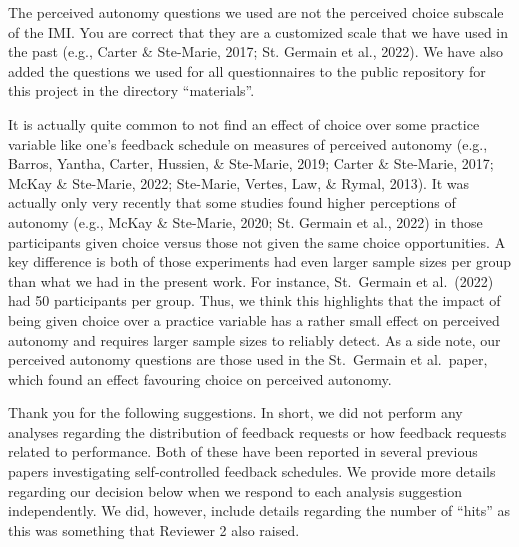 \documentclass[final]{article}
\newcommand{\TaskEstimationBox}[2]{%
\ifoptiondraft{\parbox{1.0\linewidth}{\hfill \hfill {\colorbox{#2}{\color{White} \textbf{#1}}}}}%
{}%
}
\def\Done {\TaskEstimationBox{Done}{Blue}}
\begin{document}
The perceived autonomy questions we used are not the perceived choice subscale of the IMI. You are correct that they are a customized scale that we have used in the past (e.g., Carter \& Ste-Marie, 2017; St. Germain et al., 2022). We have also added the questions we used for all questionnaires to the public repository for this project in the directory ``materials''.

\Done


It is actually quite common to not find an effect of choice over some practice variable like one's feedback schedule on measures of perceived autonomy (e.g., Barros, Yantha, Carter, Hussien, \& Ste-Marie, 2019; Carter \& Ste-Marie, 2017; McKay \& Ste-Marie, 2022; Ste-Marie, Vertes, Law, \& Rymal, 2013). It was actually only very recently that some studies found higher perceptions of autonomy (e.g., McKay \& Ste-Marie, 2020; St. Germain et al., 2022) in those participants given choice versus those not given the same choice opportunities. A key difference is both of those experiments had even larger sample sizes per group than what we had in the present work. For instance, St.~Germain et al.~(2022) had 50 participants per group. Thus, we think this highlights that the impact of being given choice over a practice variable has a rather small effect on perceived autonomy and requires larger sample sizes to reliably detect. As a side note, our perceived autonomy questions are those used in the St.~Germain et al.~paper, which found an effect favouring choice on perceived autonomy.

\Done


Thank you for the following suggestions. In short, we did not perform any analyses regarding the distribution of feedback requests or how feedback requests related to performance. Both of these have been reported in several previous papers investigating self-controlled feedback schedules. We provide more details regarding our decision below when we respond to each analysis suggestion independently. We did, however, include details regarding the number of ``hits'' as this was something that Reviewer 2 also raised.
\end{document}
